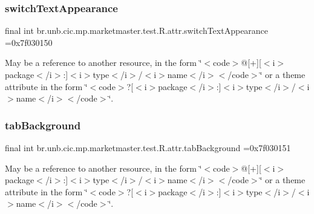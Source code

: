 \subsubsection{\texorpdfstring{switch\+Text\+Appearance}{switchTextAppearance}}
{\footnotesize\ttfamily final int br.\+unb.\+cic.\+mp.\+marketmaster.\+test.\+R.\+attr.\+switch\+Text\+Appearance =0x7f030150\hspace{0.3cm}{\ttfamily [static]}}

May be a reference to another resource, in the form \char`\"{}$<$code$>$@\mbox{[}+\mbox{]}\mbox{[}$<$i$>$package$<$/i$>$\+:\mbox{]}$<$i$>$type$<$/i$>$/$<$i$>$name$<$/i$>$$<$/code$>$\char`\"{} or a theme attribute in the form \char`\"{}$<$code$>$?\mbox{[}$<$i$>$package$<$/i$>$\+:\mbox{]}$<$i$>$type$<$/i$>$/$<$i$>$name$<$/i$>$$<$/code$>$\char`\"{}. \mbox{\label{classbr_1_1unb_1_1cic_1_1mp_1_1marketmaster_1_1test_1_1R_1_1attr_ad47f37562ab47270f7f8b998252b33d0}} 
\subsubsection{\texorpdfstring{tab\+Background}{tabBackground}}
{\footnotesize\ttfamily final int br.\+unb.\+cic.\+mp.\+marketmaster.\+test.\+R.\+attr.\+tab\+Background =0x7f030151\hspace{0.3cm}{\ttfamily [static]}}

May be a reference to another resource, in the form \char`\"{}$<$code$>$@\mbox{[}+\mbox{]}\mbox{[}$<$i$>$package$<$/i$>$\+:\mbox{]}$<$i$>$type$<$/i$>$/$<$i$>$name$<$/i$>$$<$/code$>$\char`\"{} or a theme attribute in the form \char`\"{}$<$code$>$?\mbox{[}$<$i$>$package$<$/i$>$\+:\mbox{]}$<$i$>$type$<$/i$>$/$<$i$>$name$<$/i$>$$<$/code$>$\char`\"{}. \mbox{\label{classbr_1_1unb_1_1cic_1_1mp_1_1marketmaster_1_1test_1_1R_1_1attr_a3e2eeeab659204bdf4c12115a03c9fc3}} 
